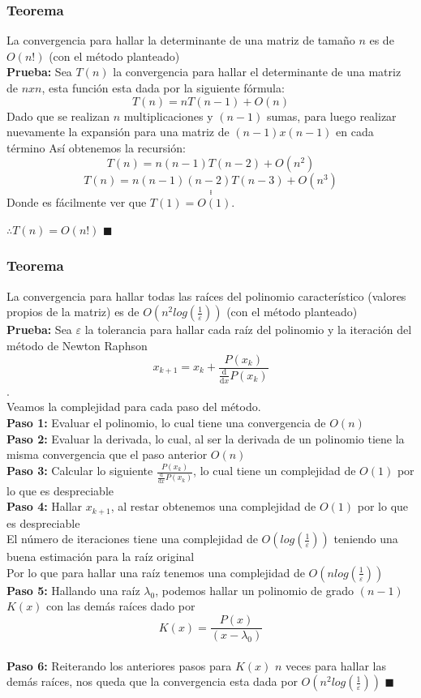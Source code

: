 \subsubsection{Teorema}
La convergencia para hallar la determinante de una matriz de tamaño $n$ es de $O(n!)$ (con el método planteado) \\ 

\textbf{Prueba:} Sea $T(n)$ la convergencia para hallar el determinante de una matriz de $nxn$, esta función esta dada por la siguiente fórmula: $$T(n)=nT(n-1)+O(n)$$
Dado que se realizan $n$ multiplicaciones y $(n-1)$ sumas, para luego realizar nuevamente la expansión para una matriz de $(n-1)x(n-1)$ en cada término 
Así obtenemos la recursión: $$T(n)=n(n-1)T(n-2)+O(n^2)$$ $$T(n)=n(n-1)(n-2)T(n-3)+O(n^3)$$ $$.$$ $$.$$
 $$.$$ Donde es fácilmente ver que $T(1)=O(1)$.\\ 
 \begin{center}
     $\therefore T(n)=O(n!)$ $\blacksquare$
 \end{center}
\subsubsection{Teorema}
La convergencia para hallar todas las raíces del polinomio característico (valores propios de la matriz) es de $O(n^2log(\frac{1}{\varepsilon}))$ (con el método planteado)\\

\textbf{Prueba:} Sea $\varepsilon$ la tolerancia para hallar cada raíz del polinomio y la iteración del método de Newton Raphson $$x_{k+1}=x_k+\frac{P(x_k)}{\frac{\mathrm{d} }{\mathrm{d} x}P(x_k)}$$.\\

Veamos la complejidad para cada paso del método.\\
\textbf{Paso 1:} Evaluar el polinomio, lo cual tiene una convergencia de $O(n)$\\
\textbf{Paso 2:} Evaluar la derivada, lo cual, al ser la derivada de un polinomio tiene la misma convergencia que el paso anterior $O(n)$\\
\textbf{Paso 3:} Calcular lo siguiente $\frac{P(x_k)}{\frac{\mathrm{d} }{\mathrm{d} x}P(x_k)}$, lo cual tiene un complejidad de $O(1)$ por lo que es despreciable \\
\textbf{Paso 4:} Hallar $x_{k+1}$, al restar obtenemos una complejidad de $O(1)$ por lo que es despreciable \\
El número de iteraciones tiene una complejidad de $O(log(\frac{1}{\varepsilon}))$ teniendo una buena estimación para la raíz original\\
Por lo que para hallar una raíz tenemos una complejidad de $O(nlog(\frac{1}{\varepsilon}))$\\
\textbf{Paso 5:} Hallando una raíz $\lambda_0$, podemos hallar un polinomio de grado $(n-1)$ $K(x)$ con las demás raíces dado por $$K(x)=\frac{P(x)}{(x-\lambda_0)}$$\\
\textbf{Paso 6:} Reiterando los anteriores pasos para $K(x)$ $n$ veces para hallar las demás raíces, nos queda que la convergencia esta dada por $O(n^2log(\frac{1}{\varepsilon}))$ $\blacksquare$\\

